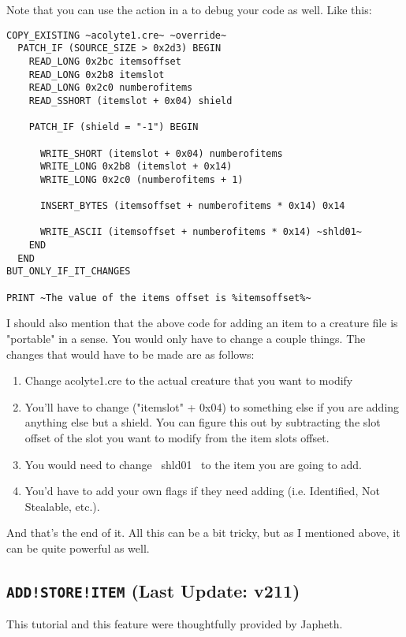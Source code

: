 \documentclass{article}
\def\ttref#1{\ahrefloc{#1}{\tt #1}}
\def\DEFINE#1{{\tt \bf #1}\label{#1}\index{#1}}
\begin{document}
Note that you can use the \ttref{PRINT} action in a \ttref{tp2} to debug
your code as well.  Like this:

\begin{verbatim}
COPY_EXISTING ~acolyte1.cre~ ~override~
  PATCH_IF (SOURCE_SIZE > 0x2d3) BEGIN
    READ_LONG 0x2bc itemsoffset
    READ_LONG 0x2b8 itemslot
    READ_LONG 0x2c0 numberofitems
    READ_SSHORT (itemslot + 0x04) shield

    PATCH_IF (shield = "-1") BEGIN

      WRITE_SHORT (itemslot + 0x04) numberofitems
      WRITE_LONG 0x2b8 (itemslot + 0x14)
      WRITE_LONG 0x2c0 (numberofitems + 1)

      INSERT_BYTES (itemsoffset + numberofitems * 0x14) 0x14

      WRITE_ASCII (itemsoffset + numberofitems * 0x14) ~shld01~
    END
  END
BUT_ONLY_IF_IT_CHANGES

PRINT ~The value of the items offset is %itemsoffset%~
\end{verbatim}

I should also mention that the above code for adding an item to a creature
file is "portable" in a sense.  You would only have to change a couple
things.  The changes that would have to be made are as follows:

\begin{enumerate}
\item Change acolyte1.cre to the actual creature that you want to modify
\item You'll have to change ("itemslot" + 0x04) to something else if you
are adding anything else but a shield.  You can figure this out by
subtracting the slot offset of the slot you want to modify from the item
slots offset.
\item You would need to change ~shld01~ to the item you are going to add.
\item You'd have to add your own flags if they need adding  (i.e.
Identified, Not Stealable, etc.).
\end{enumerate}

And that's the end of it.  All this can be a bit tricky, but as I mentioned
above, it can be quite powerful as well.


\subsection{\DEFINE{ADD!STORE!ITEM} (Last Update: v211)}
This tutorial and this feature were thoughtfully provided by Japheth.
\end{document}
